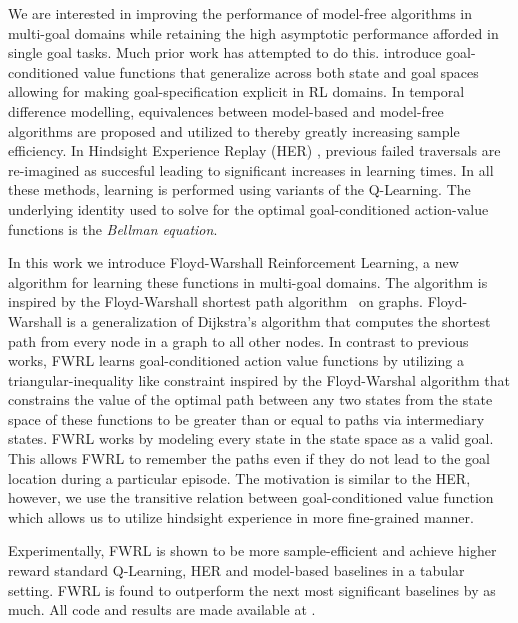 We are interested in improving the performance of model-free algorithms
in multi-goal domains while retaining the high asymptotic performance
afforded in single goal tasks. Much prior work has attempted to do this.
\citet{schaul2015universal} introduce goal-conditioned value functions
that generalize across both state and goal spaces allowing for making
goal-specification explicit in RL domains. In temporal difference
modelling, equivalences between model-based and model-free algorithms
are proposed and utilized to thereby greatly increasing sample
efficiency. In Hindsight Experience Replay (HER)
\cite{anderson2017vision}, previous failed traversals are re-imagined as
succesful leading to significant increases in learning times. In all
these methods, learning is performed using variants of the Q-Learning.
The underlying identity used to solve for the optimal goal-conditioned
action-value functions is the \emph{Bellman equation}. 

In this work we introduce Floyd-Warshall Reinforcement Learning, a new
algorithm for learning these functions in multi-goal domains. The
algorithm is inspired by the Floyd-Warshall shortest path
algorithm~\cite{floydwarshall1962} on graphs. Floyd-Warshall is a
generalization of Dijkstra's algorithm that computes the shortest path
from every node in a graph to all other nodes. In contrast to previous
works, FWRL learns goal-conditioned action value functions by utilizing
a triangular-inequality like constraint inspired by the Floyd-Warshal
algorithm that constrains the value of the optimal path between any two
states from the state space of these functions to be greater than or
equal to paths via intermediary states. FWRL works by modeling every
state in the state space as a valid goal. This allows FWRL to remember
the paths even if they do not lead to the goal location during a
particular episode. The motivation is similar to the HER, however, we
use the transitive relation between goal-conditioned value function
which allows us to utilize hindsight experience in more fine-grained
manner.

Experimentally, FWRL is shown to be more sample-efficient and achieve
higher reward standard Q-Learning, HER and model-based baselines in a
tabular setting.  FWRL is found to outperform the next most significant
baselines by as much. All code and results are made available at
\href{}{}. 






